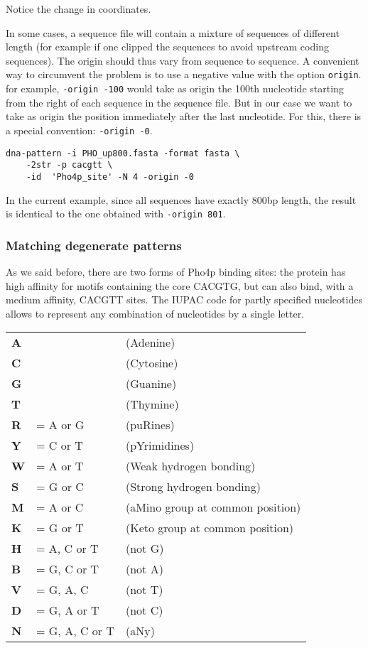Notice the change in coordinates.

In some cases, a sequence file will contain a mixture of sequences of
different length (for example if one clipped the sequences to avoid
upstream coding sequences). The origin should thus vary from sequence
to sequence. A convenient way to circumvent the problem is to use a
negative value with the option \texttt{origin}. for example,
\texttt{-origin -100} would take as origin the 100th nucleotide
starting from the right of each sequence in the sequence file. But in
our case we want to take as origin the position immediately after the
last nucleotide. For this, there is a special convention: \texttt{-origin
-0}.

\begin{verbatim}
dna-pattern -i PHO_up800.fasta -format fasta \
    -2str -p cacgtt \
    -id  'Pho4p_site' -N 4 -origin -0
\end{verbatim}

In the current example, since all sequences have exactly 800bp length,
the result is identical to the one obtained with \texttt{-origin 801}.

\subsubsection{Matching degenerate patterns}

As we said before, there are two forms of Pho4p binding sites: the
protein has high affinity for motifs containing the core CACGTG, but
can also bind, with a medium affinity, CACGTT sites. The IUPAC code
for partly specified nucleotides allows to represent any combination
of nucleotides by a single letter.

\begin{tabular}{lll}
\textbf{A} &  & (Adenine) \\
\textbf{C} &  & (Cytosine) \\
\textbf{G} &  & (Guanine) \\
\textbf{T} &  & (Thymine) \\
\textbf{R} & = A or G & (puRines) \\
\textbf{Y} & = C or T & (pYrimidines) \\
\textbf{W} & = A or T & (Weak hydrogen bonding) \\
\textbf{S} & = G or C & (Strong hydrogen bonding) \\
\textbf{M} & = A or C & (aMino group at common position) \\
\textbf{K} & = G or T & (Keto group at common position) \\
\textbf{H} & = A, C or T & (not G) \\
\textbf{B} & = G, C or T & (not A) \\
\textbf{V} & = G, A, C & (not T) \\
\textbf{D} & = G, A or T & (not C) \\
\textbf{N} & = G, A, C or T & (aNy) \\
\end{tabular}

